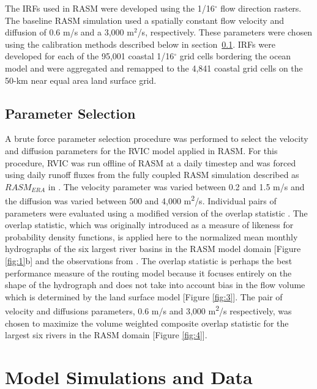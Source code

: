 \documentclass[jgrga, draft]{agutex}
\begin{document}
\begin{article}
The IRFs used in RASM were developed using the \citet{Wu_2011} 1/16$^{\circ}$ flow direction rasters.
The baseline RASM simulation used a spatially constant flow velocity and diffusion of 0.6 m/s and a 3,000 m$^2$/s, respectively.
These parameters were chosen using the calibration methods described below in section~\ref{sec:parameters}.
IRFs were developed for each of the 95,001 coastal 1/16$^{\circ}$ grid cells bordering the ocean model and were aggregated and remapped to the 4,841 coastal grid cells on the 50-km near equal area land surface grid.

\subsection{Parameter Selection}
\label{sec:parameters}

A brute force parameter selection procedure was performed to select the velocity and diffusion parameters for the RVIC model applied in RASM.
For this procedure, RVIC was run offline of RASM at a daily timestep and was forced using daily runoff fluxes from the fully coupled RASM simulation described as $RASM_{ERA}$ in \citep{Hamman_2016}.
The velocity parameter was varied between 0.2 and 1.5 m/s and the diffusion was varied between 500 and 4,000 m\textsuperscript{2}/s.
Individual pairs of parameters were evaluated using a modified version of the overlap statistic \citet{Perkins_2012}.
The overlap statistic, which was originally introduced as a measure of likeness for probability density functions, is applied here to the normalized mean monthly hydrographs of the six largest river basins in the RASM model domain [Figure \ref{fig:1}b] and the observations from \citet{Dai_2009}.
The overlap statistic is perhaps the best performance measure of the routing model because it focuses entirely on the shape of the hydrograph and does not take into account bias in the flow volume which is determined by the land surface model [Figure \ref{fig:3}].
The pair of velocity and diffusions parameters, 0.6 m/s and 3,000 m\textsuperscript{2}/s respectively, was chosen to maximize the volume weighted composite overlap statistic for the largest six rivers in the RASM domain [Figure \ref{fig:4}].

\section{Model Simulations and Data}


\end{article}
\end{document}
